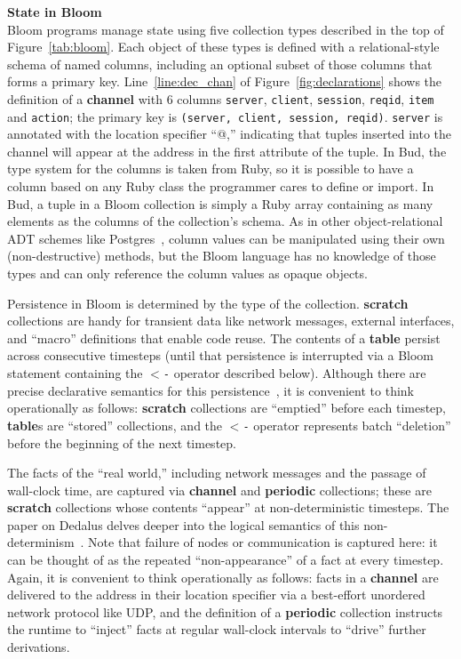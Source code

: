 \vspace{9pt}\noindent\textbf{State in Bloom}\\
Bloom programs manage state using five collection types described in
the top of Figure~\ref{tab:bloom}. Each object of these types is defined with a
relational-style schema of named columns, including an optional subset of those
columns that forms a primary key.  
Line~\ref{line:dec_chan} of
Figure~\ref{fig:declarations} shows the definition of a \textbf{channel} with 6
columns \texttt{server}, \texttt{client}, \texttt{session}, \texttt{reqid}, \texttt{item} and \texttt{action}; the
primary key is \texttt{(server, client, session, reqid)}. \texttt{server} is annotated with the location
specifier ``@,''
indicating that tuples inserted into the channel will appear at the address
in the first attribute of the tuple.
In Bud, the type system for the
columns is taken from Ruby, so it is possible to have a column based on any Ruby
class the programmer cares to define or import.  In Bud, a tuple in a Bloom
collection is simply a Ruby array containing as many elements as the columns of
the collection's schema.  As in other object-relational ADT schemes like
Postgres~\cite{postgres-adt}, column values can be manipulated using their own
(non-destructive) methods, but the Bloom language has no knowledge of those
types and can only reference the column values as opaque objects.

Persistence in Bloom is determined by the type of the collection.
\textbf{scratch} collections are handy for transient data like network messages,
external interfaces,
and ``macro'' definitions that enable code reuse. The contents of a
\textbf{table} persist across consecutive timesteps (until that persistence is
interrupted via a Bloom statement containing the \texttt{$<$-} operator
described below). Although there are precise declarative semantics for this
persistence~\cite{dedalus}, it is convenient to think operationally as
follows: \textbf{scratch} collections are ``emptied'' before each timestep,
\textbf{table}s are ``stored'' collections, and the \texttt{$<$-} operator
represents batch ``deletion'' before the beginning of the next timestep.

The facts of the ``real world,'' including network messages and the passage of
wall-clock time, are captured via \textbf{channel} and \textbf{periodic}
collections; these are \textbf{scratch} collections whose contents ``appear''
at non-deterministic timesteps. 
The paper on Dedalus delves deeper into the logical semantics of this
non-determinism~\cite{dedalus}.  Note that failure of nodes or
communication is captured here: it can be thought of as the repeated
``non-appearance'' of a fact at every timestep.  Again, it is convenient to
think operationally as follows: facts in a \textbf{channel} are delivered to
the address in their location specifier via a best-effort unordered network
protocol like UDP, and the definition of a \textbf{periodic} collection
instructs the runtime to ``inject'' facts at regular wall-clock intervals to
``drive'' further derivations.

